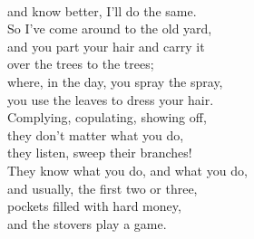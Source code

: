 \documentclass[smalldemyvopaper,11pt,twoside,onecolumn,openright,extrafontsizes]{memoir}
\begin{document}
\\and know better, I'll do the same.
\\So I've come around to the old yard,
\\and you part your hair and carry it
\\over the trees to the trees;
\\where, in the day, you spray the spray,
\\you use the leaves to dress your hair.
\\Complying, copulating, showing off,
\\they don't matter what you do,
\\they listen, sweep their branches!
\\They know what you do, and what you do,
\\and usually, the first two or three,
\\pockets filled with hard money,
\\and the stovers play a game.
\end{document}
